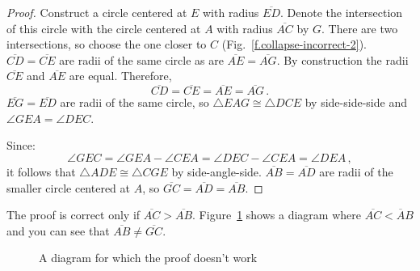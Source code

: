 \begin{proof}
Construct a circle centered at $E$ with radius $\overline{ED}$. Denote the intersection of this circle with the circle centered at $A$ with radius $\overline{AC}$ by $G$. There are two intersections, so choose the one closer to $C$ (Fig.~\ref{f.collapse-incorrect-2}).
$\overline{CD}=\overline{CE}$ are radii of the same circle as are $\overline{AE}=\overline{AG}$. By construction the radii $\overline{CE}$ and $\overline{AE}$ are equal. Therefore,
\[
\overline{CD} = \overline{CE} = \overline{AE} = \overline{AG}\,.
\]
$\overline{EG} = \overline{ED}$ are radii of the same circle, so $\triangle EAG\cong \triangle DCE$ by side-side-side and $\angle GEA = \angle DEC$.

\newpage

Since:
\[
\angle GEC = \angle GEA \!-\!\angle CEA = \angle DEC\!-\!\angle CEA = \angle DEA\,,
\] it follows that $\triangle ADE\cong\triangle CGE$ by side-angle-side. $\overline{AB}=\overline{AD}$ are radii of the smaller circle centered at $A$, so $\overline{GC}=\overline{AD}=\overline{AB}$.
\end{proof}

The proof is correct only if $\overline{AC}>\overline{AB}$.  Figure~\ref{f.collapse-incorrect-4} shows a diagram where $\overline{AC}<\overline{A}B$ and you can see that $\overline{AB}\neq\overline{GC}$.

\begin{figure}[b]
\begin{center}
\end{center}
\caption{A diagram for which the proof doesn't work}\label{f.collapse-incorrect-4}
\end{figure}


